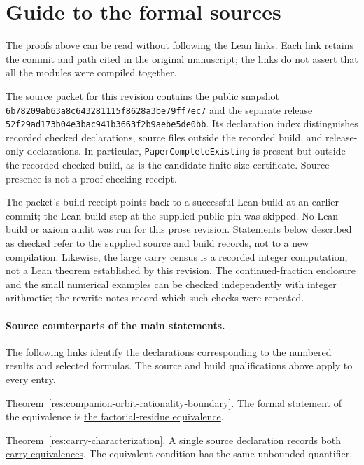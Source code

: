 \documentclass[11pt]{article}
\begin{document}
\section{Guide to the formal sources}\label{app:sources}

The proofs above can be read without following the Lean links. Each link
retains the commit and path cited in the original manuscript; the links do
not assert that all the modules were compiled together.

The source packet for this revision contains the public snapshot
\nolinkurl{6b78209ab63a8c643281115f8628a3be79ff7ec7} and the separate release
\nolinkurl{52f29ad173b04e3bac941b3663f2b9aebe5de0bb}.
Its declaration index distinguishes recorded checked declarations, source
files outside the recorded build, and release-only declarations.
In particular, \texttt{PaperCompleteExisting} is present but outside the
recorded checked build, as is the candidate finite-size certificate.
Source presence is not a proof-checking receipt.

The packet's build receipt points back to a successful Lean build at an
earlier commit; the Lean build step at the supplied public pin was skipped.
No Lean build or axiom audit was run for this prose revision. Statements
below described as checked refer to the supplied source and build records,
not to a new compilation. Likewise, the large carry census is a recorded
integer computation, not a Lean theorem established by this revision.
The continued-fraction enclosure and the small numerical examples can be
checked independently with integer arithmetic; the rewrite notes record
which such checks were repeated.

\paragraph{Source counterparts of the main statements.}
The following links identify the declarations corresponding to the numbered
results and selected formulas. The source and build qualifications above
apply to every entry.

\begingroup\small\raggedright
Theorem~\ref{res:companion-orbit-rationality-boundary}. The formal statement of the equivalence is
\href{https://github.com/wcook04/plectis-erdos/blob/f36a98bf3d3e6f65f1074e3b800e3293d5b8a51a/ErdosProblems/Erdos68/PaperCompleteExisting.lean#L29}{the factorial-residue equivalence}.

Theorem~\ref{res:carry-characterization}. A single source declaration records
\href{https://github.com/wcook04/plectis-erdos/blob/f36a98bf3d3e6f65f1074e3b800e3293d5b8a51a/ErdosProblems/Erdos68/PaperCompleteExisting.lean#L47}{both carry equivalences}. The equivalent condition
has the same unbounded quantifier.
\end{document}
